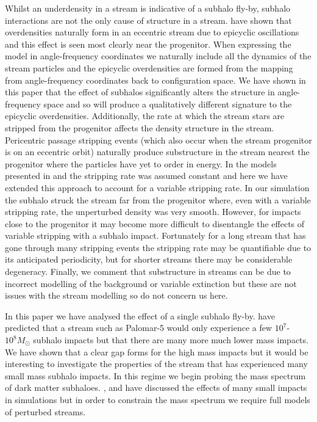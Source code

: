 \documentclass[useAMS,usenatbib,fleqn,a4paper]{mn2e}
\begin{document}
Whilst an underdensity in a stream is indicative of a subhalo fly-by, subhalo interactions are not the only cause of structure in a stream. \cite{Kuepper2010} have shown that overdensities naturally form in an eccentric stream due to epicyclic oscillations and this effect is seen most clearly near the progenitor. When expressing the model in angle-frequency coordinates we naturally include all the dynamics of the stream particles and the epicyclic overdensities are formed from the mapping from angle-frequency coordinates back to configuration space. We have shown in this paper that the effect of subhalos significantly alters the structure in angle-frequency space and so will produce a qualitatively different signature to the epicyclic overdensities. Additionally, the rate at which the stream stars are stripped from the progenitor affects the density structure in the stream. Pericentric passage stripping events (which also occur when the stream progenitor is on an eccentric orbit) naturally produce substructure in the stream nearest the progenitor where the particles have yet to order in energy. In the models presented in \cite{Bovy2014} and \cite{Sanders2014} the stripping rate was assumed constant and here we have extended this approach to account for a variable stripping rate. In our simulation the subhalo struck the stream far from the progenitor where, even with a variable stripping rate, the unperturbed density was very smooth. However, for impacts close to the progenitor it may become more difficult to disentangle the effects of variable stripping with a subhalo impact. Fortunately for a long stream that has gone through many stripping events the stripping rate may be quantifiable due to its anticipated periodicity, but for shorter streams there may be considerable degeneracy. Finally, we comment that substructure in streams can be due to incorrect modelling of the background or variable extinction but these are not issues with the stream modelling so do not concern us here.

In this paper we have analysed the effect of a single subhalo fly-by. \cite{YoonJohnstonHogg} have predicted that a stream such as Palomar-5 would only experience a few $10^7$-$10^8M_\odot$ subhalo impacts but that there are many more much lower mass impacts. We have shown that a clear gap forms for the high mass impacts but it would be interesting to investigate the properties of the stream that has experienced many small mass subhalo impacts. In this regime we begin probing the mass spectrum of dark matter subhaloes. \citet{CarlbergGD12013},\citet{NganCarlberg2014} and \citet{ngan_etal_2015} have discussed the effects of many small impacts in simulations but in order to constrain the mass spectrum we require full models of perturbed streams.
\end{document}
